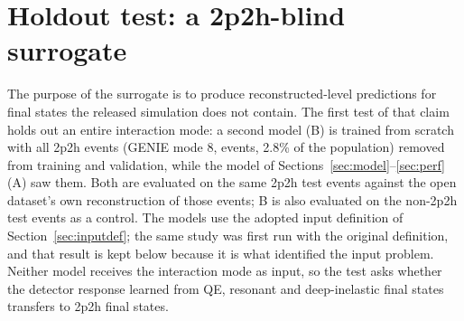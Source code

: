 \documentclass[11pt]{article}
\begin{document}
\begin{table}[h]\centering

\caption{Closure classifiers on the event-level variables: overall, by block, by single variable, and with the
truth features added.}
\label{tab:closure}
\end{table}

\begin{table}[h]\centering\small

\caption{Closure AUC (0.5 is indistinguishable) with the evaluation's classifier recipe, on the nine generated
variables and on the non-calorimetry subset that leaves out the non-vertex and isolated-blob energies, for the full
test split and for the held-out 2p2h events, models A and B. ``+ truth'' adds the truth summary features, the
flags and the multiplicity to the classifier. Values below 0.5 are fluctuations of an indistinguishable pair; the
resolution of the test is about 0.005 on the full split and 0.01 on the 2p2h sample.}
\label{tab:closure-ci}
\end{table}

\begin{table}[h]\centering

\caption{Closure of the prong set and the vertex plane.}
\label{tab:closure2}
\end{table}
\FloatBarrier

\section{Holdout test: a 2p2h-blind surrogate}
\label{sec:holdout}

The purpose of the surrogate is to produce reconstructed-level predictions for final states the released
simulation does not contain. The first test of that claim holds out an entire interaction mode: a second model
(B) is trained from scratch with all 2p2h events (GENIE mode 8, \nHtwoP{} events, 2.8\% of the population)
removed from training and validation, while the model of Sections~\ref{sec:model}--\ref{sec:perf} (A) saw them.
Both are evaluated on the same \nHtest{} 2p2h test events against the open dataset's own reconstruction of those
events; B is also evaluated on the non-2p2h test events as a control. The models use the adopted input
definition of Section~\ref{sec:inputdef}; the same study was first run with the original definition, and that
result is kept below because it is what identified the input problem. Neither model receives the interaction
mode as input, so the test asks whether the detector response learned from QE, resonant and deep-inelastic
final states transfers to 2p2h final states.
\end{document}
